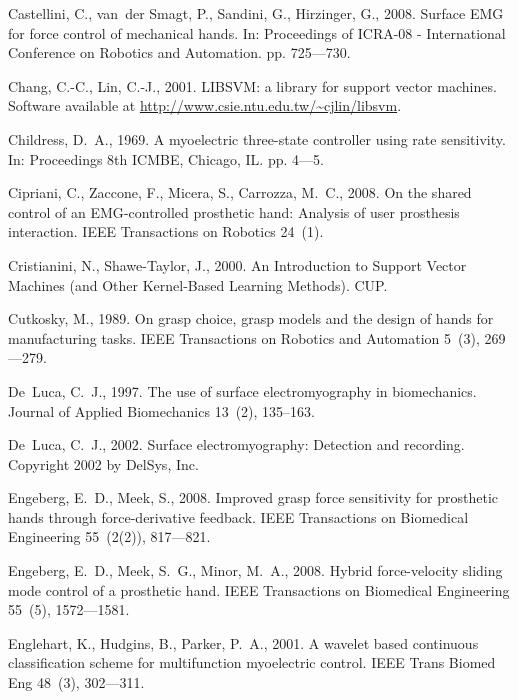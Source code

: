 \documentclass[review,authoryear]{elsarticle}
\begin{document}
\begin{thebibliography}{43}
Castellini, C., van~der Smagt, P., Sandini, G., Hirzinger, G., 2008. Surface
  {EMG} for force control of mechanical hands. In: Proceedings of {ICRA}-08 -
  International Conference on Robotics and Automation. pp. 725---730.

Chang, C.-C., Lin, C.-J., 2001. {LIBSVM}: a library for support vector
  machines. Software available at
  \url{http://www.csie.ntu.edu.tw/~cjlin/libsvm}.

Childress, D.~A., 1969. A myoelectric three-state controller using rate
  sensitivity. In: Proceedings 8th ICMBE, Chicago, IL. pp. 4---5.

Cipriani, C., Zaccone, F., Micera, S., Carrozza, M.~C., 2008. On the shared
  control of an {EMG}-controlled prosthetic hand: Analysis of user prosthesis
  interaction. IEEE Transactions on Robotics 24~(1).

Cristianini, N., Shawe-Taylor, J., 2000. An Introduction to Support Vector
  Machines (and Other Kernel-Based Learning Methods). CUP.

Cutkosky, M., 1989. On grasp choice, grasp models and the design of hands for
  manufacturing tasks. IEEE Transactions on Robotics and Automation 5~(3),
  269---279.

De~Luca, C.~J., 1997. The use of surface electromyography in biomechanics.
  Journal of Applied Biomechanics 13~(2), 135--163.

De~Luca, C.~J., 2002. Surface electromyography: Detection and recording.
  Copyright 2002 by {DelSys, Inc.}

Engeberg, E.~D., Meek, S., 2008. Improved grasp force sensitivity for
  prosthetic hands through force-derivative feedback. IEEE Transactions on
  Biomedical Engineering 55~(2(2)), 817---821.

Engeberg, E.~D., Meek, S.~G., Minor, M.~A., 2008. Hybrid force-velocity sliding
  mode control of a prosthetic hand. IEEE Transactions on Biomedical
  Engineering 55~(5), 1572---1581.

Englehart, K., Hudgins, B., Parker, P.~A., 2001. A wavelet based continuous
  classification scheme for multifunction myoelectric control. IEEE Trans
  Biomed Eng 48~(3), 302---311.


\end{thebibliography}
\end{document}
